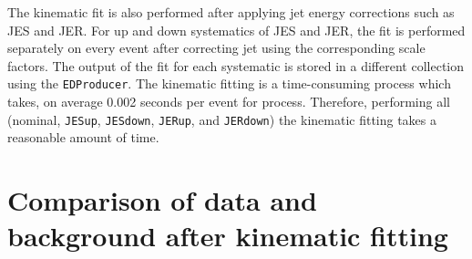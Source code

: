 The kinematic fit is also performed after applying jet energy corrections such as JES and JER.
For up and down systematics of JES and JER, the fit is performed separately 
on every event after correcting jet \pt using the corresponding scale factors.
The output of the fit for each systematic is stored in a different collection
using the \verb|EDProducer|. The kinematic fitting is a time-consuming process 
which takes, on average 0.002 seconds per event for \ttbar process. Therefore, 
performing all (nominal, \verb|JESup|, \verb|JESdown|, \verb|JERup|, and 
\verb|JERdown|) the kinematic fitting takes a reasonable amount of time.

\section{Comparison of data and background after kinematic fitting}
\label{s:secCPlotsKF}

